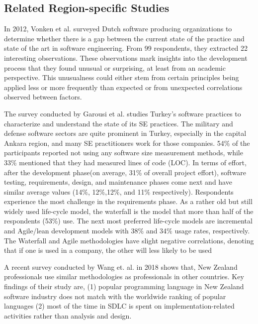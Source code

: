 \subsection{Related Region-specific Studies}
\label{region specific study}

In 2012, Vonken et al.\cite{Vonken2012} surveyed Dutch software producing organizations to determine whether there is a gap between the current state of the practice and state of the art in software engineering. From 99 respondents, they extracted 22 interesting observations. These observations mark insights into the development process that they found unusual or surprising, at least from an academic perspective. This unusualness could either stem from certain principles being applied less or more frequently than expected or from unexpected correlations observed between factors.

The survey conducted by Garousi et al.\cite{Garousi2015} studies Turkey's software practices to characterize and understand the state of its SE practices. The military and defense software sectors are quite prominent in Turkey, especially in the capital Ankara region, and many SE practitioners work for those companies. 54\% of the participants reported not using any software size measurement methods, while 33\% mentioned that they had measured lines of code (LOC). In terms of effort, after the development phase(on average, 31\% of overall project effort), software testing, requirements, design, and maintenance phases come next and have similar average values (14\%, 12\%,12\%, and 11\% respectively). Respondents experience the most challenge in the requirements phase. As a rather old but still widely used life-cycle model, the waterfall is the model that more than half of the respondents (53\%) use. The next most preferred life-cycle models are incremental and Agile/lean development models with 38\% and 34\% usage rates, respectively. The Waterfall and Agile methodologies have slight negative correlations, denoting that if one is used in a company, the other will less likely to be used


A recent survey conducted by Wang et. al.\cite{Wang2018} in 2018 shows that, New Zealand professionals use similar methodologies as professionals in other countries. Key findings of their study are, (1) popular programming language in New Zealand software industry does not match with the worldwide ranking of popular languages (2) most of the time in SDLC is spent on implementation-related activities rather than  analysis and design.

